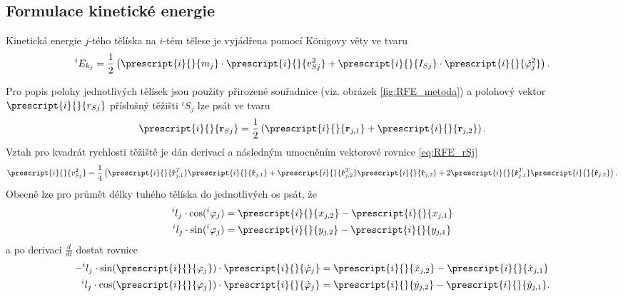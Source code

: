 \subsection{Formulace kinetické energie}

Kinetická energie $ j $-tého tělíska na $ i $-tém tělese je vyjádřena pomocí Königovy věty ve tvaru \cite{cite:bible}
\begin{equation}\label{eq:Konig}
	^{i}E_{k_{j}} = \frac{1}{2}\left( \prescript{i}{}{m_j} \cdot \prescript{i}{}{v_{Sj}^2} + \prescript{i}{}{I_{Sj}}\cdot \prescript{i}{}{\dot{\varphi}_{j}^{2}} \right) .
\end{equation}

Pro popis polohy jednotlivých tělísek jsou použity přirozené souřadnice (viz. obrázek \ref{fig:RFE_metoda}) a polohový vektor $ \prescript{i}{}{r_{Sj}} $ příslušný těžišti $ ^{i}S_{j} $ lze psát ve tvaru
\begin{equation}\label{eq:RFE_rSj}
	\prescript{i}{}{\mathbf{r}_{Sj}}=\frac{1}{2}\left( \prescript{i}{}{\mathbf{r}_{j,1}} +\prescript{i}{}{\mathbf{r}_{j,2}} \right) .
\end{equation}
Vztah pro kvadrát rychlosti těžiště je dán derivací a následným umocněním vektorové rovnice \ref{eq:RFE_rSj}
\begin{equation}\label{eq:RFE_v2}
	\prescript{i}{}{v_{Sj}^{2}}=\frac{1}{4}\left( \prescript{i}{}{\mathbf{\dot{r}}_{j,1}^T}	\prescript{i}{}{\mathbf{\dot{r}}_{j,1}} + \prescript{i}{}{\mathbf{\dot{r}}_{j,2}^T}	\prescript{i}{}{\mathbf{\dot{r}}_{j,2}} + 2 \prescript{i}{}{\mathbf{\dot{r}}_{j,1}^T} \prescript{i}{}{\mathbf{\dot{r}}_{j,2}} \right) .
\end{equation}
Obecně lze pro průmět délky tuhého tělíska do jednotlivých os psát, že
\begin{align}
	^{i}l_{j}\cdot \cos (^{i}\varphi_{j})&= \prescript{i}{}{x_{j,2}}-\prescript{i}{}{x_{j,1}} \notag \\
	^{i}l_{j}\cdot \sin (^{i}\varphi_{j})&= \prescript{i}{}{y_{j,2}}-\prescript{i}{}{y_{j,1}} 
\end{align}
a po derivaci $ \frac{d}{dt} $ dostat rovnice 
\begin{align}
	- ^{i}l_{j}\cdot \sin (\prescript{i}{}{\varphi_{j}}) \cdot \prescript{i}{}{\dot{\varphi}_{j}}&= \prescript{i}{}{\dot{x}_{j,2}}-\prescript{i}{}{\dot{x}_{j,1}} \notag \\
	^{i}l_{j}\cdot \cos (\prescript{i}{}{\varphi_{j}}) \cdot \prescript{i}{}{\dot{\varphi}_{j}}&= \prescript{i}{}{\dot{y}_{j,2}}-\prescript{i}{}{\dot{y}_{j,1}}.
\end{align}
